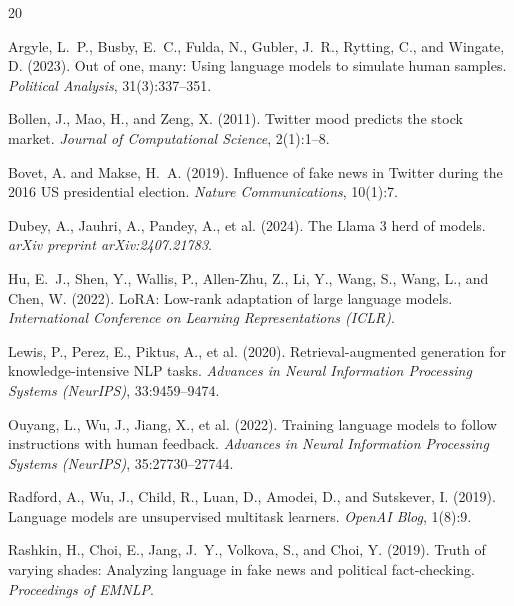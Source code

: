 \documentclass[11pt,a4paper]{article}
\begin{document}

\begin{thebibliography}{20}

Argyle, L.~P., Busby, E.~C., Fulda, N., Gubler, J.~R., Rytting, C., and Wingate, D. (2023).
\newblock Out of one, many: Using language models to simulate human samples.
\newblock \textit{Political Analysis}, 31(3):337--351.

Bollen, J., Mao, H., and Zeng, X. (2011).
\newblock Twitter mood predicts the stock market.
\newblock \textit{Journal of Computational Science}, 2(1):1--8.

Bovet, A. and Makse, H.~A. (2019).
\newblock Influence of fake news in Twitter during the 2016 US presidential election.
\newblock \textit{Nature Communications}, 10(1):7.

Dubey, A., Jauhri, A., Pandey, A., et al. (2024).
\newblock The Llama 3 herd of models.
\newblock \textit{arXiv preprint arXiv:2407.21783}.

Hu, E.~J., Shen, Y., Wallis, P., Allen-Zhu, Z., Li, Y., Wang, S., Wang, L., and Chen, W. (2022).
\newblock LoRA: Low-rank adaptation of large language models.
\newblock \textit{International Conference on Learning Representations (ICLR)}.

Lewis, P., Perez, E., Piktus, A., et al. (2020).
\newblock Retrieval-augmented generation for knowledge-intensive NLP tasks.
\newblock \textit{Advances in Neural Information Processing Systems (NeurIPS)}, 33:9459--9474.

Ouyang, L., Wu, J., Jiang, X., et al. (2022).
\newblock Training language models to follow instructions with human feedback.
\newblock \textit{Advances in Neural Information Processing Systems (NeurIPS)}, 35:27730--27744.

Radford, A., Wu, J., Child, R., Luan, D., Amodei, D., and Sutskever, I. (2019).
\newblock Language models are unsupervised multitask learners.
\newblock \textit{OpenAI Blog}, 1(8):9.

Rashkin, H., Choi, E., Jang, J.~Y., Volkova, S., and Choi, Y. (2019).
\newblock Truth of varying shades: Analyzing language in fake news and political fact-checking.
\newblock \textit{Proceedings of EMNLP}.


\end{thebibliography}
\end{document}
